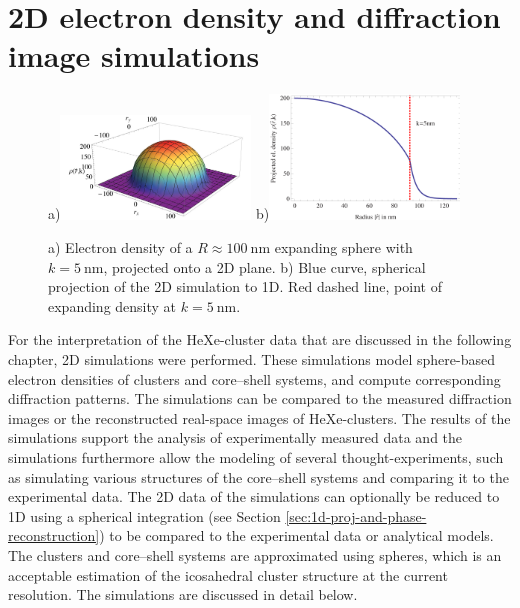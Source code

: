 \section{2D electron density and diffraction image simulations}\label{sec:2d-simulations}
\begin{figure}
	\centering
		a)\includegraphics[width=0.45\textwidth]{images/cluster-generation-2D.jpg}
		b)\includegraphics[width=0.45\textwidth]{images/cluster-generation-1D.png}
	\caption[Used electron densities in 2D real and Fourier space simulations.]{a) Electron density of a $R\approx \SI{100}{\nano\meter}$ expanding sphere with $k=\SI{5}{\nano\meter}$, projected onto a 2D plane. b) Blue curve, spherical projection of the 2D simulation to 1D. Red dashed line, point of expanding density at $k=\SI{5}{\nano\meter}$.}
	\label{fig:cluster-generation}
\end{figure}
For the interpretation of the HeXe-cluster data that are discussed in the following chapter, 2D simulations were performed. These simulations model sphere-based electron densities of clusters and core--shell systems, and compute corresponding diffraction patterns. The simulations can be compared to the measured diffraction images or the reconstructed real-space images of HeXe-clusters. The results of the simulations support the analysis of experimentally measured data and the simulations furthermore allow the modeling of several thought-experiments, such as simulating various structures of the core--shell systems and comparing it to the experimental data. The 2D data of the simulations can optionally be reduced to 1D using a spherical integration (see Section \ref{sec:1d-proj-and-phase-reconstruction}) to be compared to the experimental data or analytical models. The clusters and core--shell systems are approximated using spheres, which is an acceptable estimation of the icosahedral cluster structure at the current resolution. The simulations are discussed in detail below.\\[1\baselineskip]
